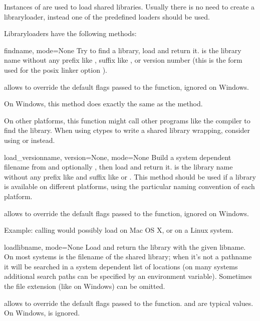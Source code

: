 Instances of  are used to load shared libraries.
Usually there is no need to create a libraryloader, instead one of the
predefined loaders should be used.

Libraryloaders have the following methods:

\begin{funcdesc}{find}{name, mode=None}
Try to find a library, load and return it.   is the
library name without any prefix like , suffix like ,
 or version number (this is the form used for the posix
linker option ).

 allows to override the default flags passed to the
 function, ignored on Windows.

On Windows, this method does exactly the same as the 
method.

On other platforms, this function might call other programs like
the compiler to find the library.  When using ctypes to write a
shared library wrapping, consider using  or
 instead.
\end{funcdesc}

\begin{funcdesc}{load_version}{name, version=None, mode=None}
Build a system dependent filename from  and optionally
, then load and return it.   is the library
name without any prefix like  and suffix like  or
.  This method should be used if a library is available
on different platforms, using the particular naming convention of
each platform.

 allows to override the default flags passed to the
 function, ignored on Windows.

Example: calling  would
possibly load  on Mac OS X, or
 on a Linux system.
\end{funcdesc}

\begin{funcdesc}{load}{libname, mode=None}
Load and return the library with the given libname.  On most
systems  is the filename of the shared library; when
it's not a pathname it will be searched in a system dependent list
of locations (on many systems additional search paths can be
specified by an environment variable).  Sometimes the file
extension (like  on Windows) can be omitted.

 allows to override the default flags passed to the
 function.   and  are
typical values.  On Windows,  is ignored.
\end{funcdesc}

